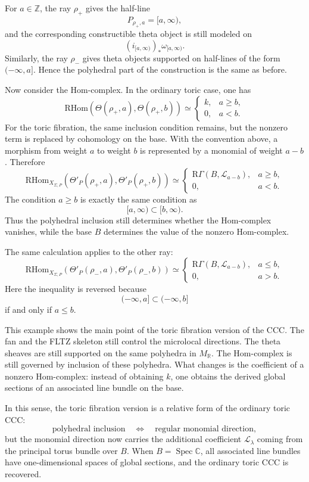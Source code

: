 For \(a\in\mathbb Z\), the ray \(\rho_+\) gives the half-line
\[
P_{\rho_+,a}=[a,\infty),
\]
and the corresponding constructible theta object is still modeled on
\[
(i_{[a,\infty)})_*\omega_{[a,\infty)}.
\]
Similarly, the ray \(\rho_-\) gives theta objects supported on half-lines of
the form \((-\infty,a]\). Hence the polyhedral part of the construction is the
same as before.

Now consider the Hom-complex. In the ordinary toric case, one has
\[
\mathrm{RHom}(\Theta(\rho_+,a),\Theta(\rho_+,b))
\simeq
\begin{cases}
k, & a\ge b,\\
0, & a<b.
\end{cases}
\]
For the toric fibration, the same inclusion condition remains, but the
nonzero term is replaced by cohomology on the base. With the convention above,
a morphism from weight \(a\) to weight \(b\) is represented by a monomial of
weight \(a-b\). Therefore
\[
\mathrm{RHom}_{X_{\Sigma,P}}
(\Theta'_P(\rho_+,a),\Theta'_P(\rho_+,b))
\simeq
\begin{cases}
\mathrm{R}\Gamma(B,\mathcal L_{a-b}), & a\ge b,\\
0, & a<b.
\end{cases}
\]
The condition \(a\ge b\) is exactly the same condition as
\[
[a,\infty)\subset [b,\infty).
\]
Thus the polyhedral inclusion still determines whether the Hom-complex
vanishes, while the base \(B\) determines the value of the nonzero
Hom-complex.

The same calculation applies to the other ray:
\[
\mathrm{RHom}_{X_{\Sigma,P}}
(\Theta'_P(\rho_-,a),\Theta'_P(\rho_-,b))
\simeq
\begin{cases}
\mathrm{R}\Gamma(B,\mathcal L_{a-b}), & a\le b,\\
0, & a>b.
\end{cases}
\]
Here the inequality is reversed because
\[
(-\infty,a]\subset(-\infty,b]
\]
if and only if \(a\le b\).

This example shows the main point of the toric fibration version of the CCC.
The fan and the FLTZ skeleton still control the microlocal directions. The
theta sheaves are still supported on the same polyhedra in \(M_{\mathbb R}\).
The Hom-complex is still governed by inclusion of these polyhedra. What changes
is the coefficient of a nonzero Hom-complex: instead of obtaining \(k\), one
obtains the derived global sections of an associated line bundle on the base.

In this sense, the toric fibration version is a relative form of the ordinary
toric CCC:
\[
\text{polyhedral inclusion}
\quad\Longleftrightarrow\quad
\text{regular monomial direction},
\]
but the monomial direction now carries the additional coefficient
\(\mathcal L_\lambda\) coming from the principal torus bundle over \(B\).
When \(B=\operatorname{Spec}\mathbb C\), all associated line bundles have
one-dimensional spaces of global sections, and the ordinary toric CCC is
recovered.



